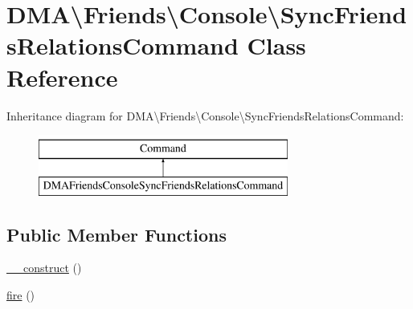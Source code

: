 \hypertarget{classDMA_1_1Friends_1_1Console_1_1SyncFriendsRelationsCommand}{\section{D\-M\-A\textbackslash{}Friends\textbackslash{}Console\textbackslash{}Sync\-Friends\-Relations\-Command Class Reference}
\label{classDMA_1_1Friends_1_1Console_1_1SyncFriendsRelationsCommand}
}
Inheritance diagram for D\-M\-A\textbackslash{}Friends\textbackslash{}Console\textbackslash{}Sync\-Friends\-Relations\-Command\-:\begin{figure}[H]
\begin{center}
\leavevmode
\includegraphics[height=2.000000cm]{d5/dee/classDMA_1_1Friends_1_1Console_1_1SyncFriendsRelationsCommand}
\end{center}
\end{figure}
\subsection*{Public Member Functions}
\begin{DoxyCompactItemize}
\item 
\hyperlink{classDMA_1_1Friends_1_1Console_1_1SyncFriendsRelationsCommand_ad7d4bd66608d25ccd00ce87331287183}{\-\_\-\-\_\-construct} ()
\item 
\hyperlink{classDMA_1_1Friends_1_1Console_1_1SyncFriendsRelationsCommand_a075f13536ecb959b0a54c2e74822e35c}{fire} ()
\end{DoxyCompactItemize}
